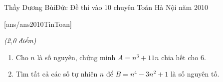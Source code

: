 \begin{name}
{Thầy Dương BùiĐức}
{Đề thi vào 10 chuyên Toán Hà Nội năm 2010}
\end{name}
\setcounter{ex}{0}
[ans/ans2010TinToan]
\begin{ex}{\it{(2,0 điểm)}}%
\begin{enumerate}
		\item Cho $n$ là số nguyên, chứng minh $A = n^3 + 11n$ chia hết cho $6$.
		\item Tìm tất cả các số tự nhiên $n$ để $B = n^4 - 3n^2 + 1$ là số nguyên tố.
		\end{enumerate}
\end{ex}
